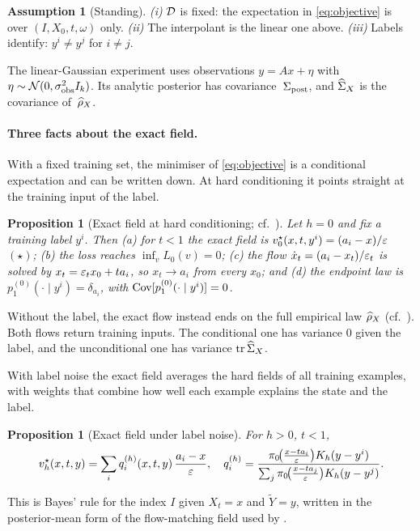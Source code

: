 \documentclass{article} %
\theoremstyle{plain}
\newtheorem{proposition}[theorem]{Proposition}
\theoremstyle{definition}
\newtheorem{assumption}{Assumption}
\theoremstyle{remark}
\begin{document}
\begin{assumption}[Standing]
\label{as:standing}
\emph{(i)} $\mathcal{D}$ is fixed: the expectation in \eqref{eq:objective} is over
$(I,X_0,t,\omega)$ only. \emph{(ii)} The interpolant is the linear one above.
\emph{(iii)} Labels identify: $y^i\neq y^j$ for $i\neq j$.
\end{assumption}

The linear-Gaussian experiment uses observations $y=Ax+\eta$ with $\eta\sim\mathcal{N}(0,\sigma_{\mathrm{obs}}^2I_k)$.
Its analytic posterior has covariance~$\Sigma_{\mathrm{post}}$, and $\widehat{\Sigma}_X$ is the covariance of~$\widehat{\rho}_X$.

\paragraph{Three facts about the exact field.} With a fixed training set, the minimiser of
\eqref{eq:objective} is a conditional expectation and can be written down. At hard conditioning it
points straight at the training input of the label.

\begin{proposition}[{Exact field at hard conditioning; cf.\ \citealp[Theorem~6.4]{baptista2025memorization}}]
\label{prop:collapse}
Let $h=0$ and fix a training label $y^i$. Then
(a) for $t<1$ the exact field is $v_0^\star(x,t,y^i)=(a_i-x)/\varepsilon$ $(\star)$;
(b) the loss reaches $\inf_v L_0(v)=0$;
(c) the flow $\dot x_t=(a_i-x_t)/\varepsilon_t$ is solved by
$x_t=\varepsilon_tx_0+ta_i$, so $x_t\to a_i$ from every $x_0$; and
(d) the endpoint law is $p_1^{(0)}(\cdot\mid y^i)=\delta_{a_i}$, with $\operatorname{Cov}[p_1^{(0)}(\cdot\mid y^i)]=0$.
\end{proposition}
Without the label, the exact flow instead ends on the full empirical law $\widehat{\rho}_X$
(cf.\ \citealp{wan2025elucidating}). Both flows return training inputs. The conditional one has
variance $0$ given the label, and the unconditional one has variance $\operatorname{tr}\widehat{\Sigma}_X$.

With label noise the exact field averages the hard fields of all training examples, with weights
that combine how well each example explains the state and the label.

\begin{proposition}[Exact field under label noise]
\label{prop:kernel-field}
For $h>0$, $t<1$,
\begin{equation}
v_h^\star(x,t,y)=\sum_i q_i^{(h)}(x,t,y)\,\frac{a_i-x}{\varepsilon},\quad
q_i^{(h)}=\frac{\pi_0\!\big(\tfrac{x-ta_i}{\varepsilon}\big)K_h(y-y^i)}
{\sum_j\pi_0\!\big(\tfrac{x-ta_j}{\varepsilon}\big)K_h(y-y^j)}.
\label{eq:kernel-field}
\end{equation}
\end{proposition}
This is Bayes' rule for the index $I$ given $X_t=x$ and $\widetilde Y=y$, written in the
posterior-mean form of the flow-matching field used by \citet{wan2025elucidating}.
\end{document}
